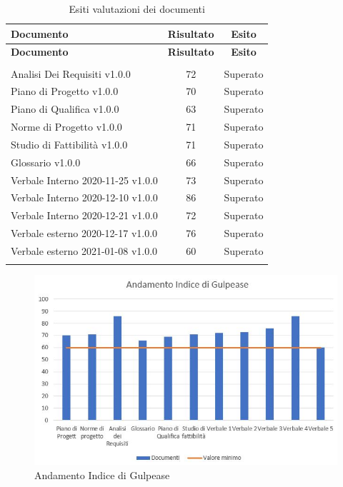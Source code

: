 \documentclass[../piano_di_qualifica.tex]{subfiles}
\begin{document}
\begin{center}
	\begin{longtable}{|l|c|c|}
		\hline
		\rowcolor{lightgray}
		\textbf{Documento}                 & \textbf{Risultato} & \textbf{Esito} \\
		\hline
		\endfirsthead

		\hline
		\rowcolor{lightgray}
		\textbf{Documento}                 & \textbf{Risultato} & \textbf{Esito} \\
		\hline
		\endhead

		\hline
		\rowcolor{white}
		\multicolumn{3}{|c|}{\emph{Continua alla pagina successiva...}} \\
		\hline
		\endfoot
		\endlastfoot

		Analisi Dei Requisiti v1.0.0       & 72                 & Superato       \\
		Piano di Progetto v1.0.0           & 70                 & Superato       \\
		Piano di Qualifica v1.0.0          & 63                 & Superato       \\
		Norme di Progetto v1.0.0           & 71                 & Superato       \\
		Studio di Fattibilità v1.0.0       & 71                 & Superato       \\
		Glossario v1.0.0                   & 66                 & Superato       \\
		Verbale Interno 2020-11-25 v1.0.0  & 73                 & Superato       \\
		Verbale Interno 2020-12-10 v1.0.0  & 86                 & Superato       \\
		Verbale Interno 2020-12-21 v1.0.0  & 72                 & Superato       \\
		Verbale esterno 2020-12-17  v1.0.0 & 76                 & Superato       \\
		Verbale esterno 2021-01-08  v1.0.0 & 60                 & Superato       \\
		\hline
		\rowcolor{white}
		\caption{Esiti valutazioni dei documenti}
	\end{longtable}
\end{center}

\begin{figure}[H]
	\centering
	\includegraphics[width=12cm]{img/media_gul.jpg}
	\caption{ Andamento Indice di Gulpease}
\end{figure}
\end{document}
